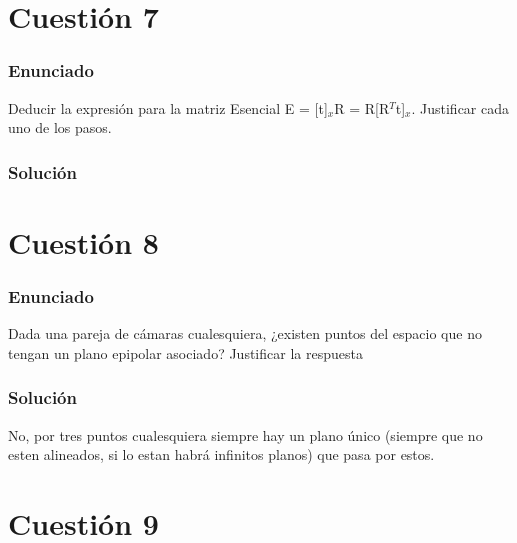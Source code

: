 
\section{Cuestión 7}

\subsubsection{Enunciado}

Deducir la expresión para la matriz Esencial E = [t]$ _{x} $R = R[R$ ^{T} $t]$ _{x} $. Justificar cada uno de los pasos.

\subsubsection{Solución}


\section{Cuestión 8}

\subsubsection{Enunciado}

Dada una pareja de cámaras cualesquiera, ¿existen puntos del espacio que no tengan un plano epipolar asociado? Justificar la respuesta

\subsubsection{Solución}

No, por tres puntos cualesquiera siempre hay un plano único (siempre que no esten alineados, si lo estan habrá infinitos planos) que pasa por estos.

\section{Cuestión 9}


